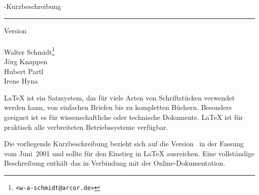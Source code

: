 \begin{titlepage}
\renewcommand{\thefootnote}{\fnsymbol{footnote}}
{\Huge%
\selectfont
\raggedright
\sbLaTeXe-Kurzbeschreibung
\rule{\textwidth}{0.75pt}
\par
}
\begin{flushleft}
  \normalsize
  \selectfont
  Version \lkver\\
  \lkdate\\[2ex]
  Walter Schmidt\footnote{\texttt{<w-a-schmidt@arcor.de>}}\\
  Jörg Knappen\\
  Hubert Partl%
    \\
  Irene Hyna%
  \\
\end{flushleft}

\vfill

{\parindent=0cm
\LaTeX{} ist ein Satzsystem, das für viele Arten von
Schriftstücken verwendet werden kann, von einfachen Briefen bis zu
kompletten Büchern.  Besonders geeignet ist es für 
wissenschaftliche oder technische Dokumente. \LaTeX{} ist für 
praktisch alle verbreiteten Betriebssysteme verfügbar.
 
Die vorliegende Kurzbeschreibung bezieht sich auf die Version
\LaTeXe\ in der Fassung vom Juni~2001 und sollte für den 
Einstieg in \LaTeX{} ausreichen.  
Eine vollständige Beschreibung enthält das \manual{}
in Verbindung mit der Online-Dokumentation.
}
\setcounter{footnote}{0}
\end{titlepage}


